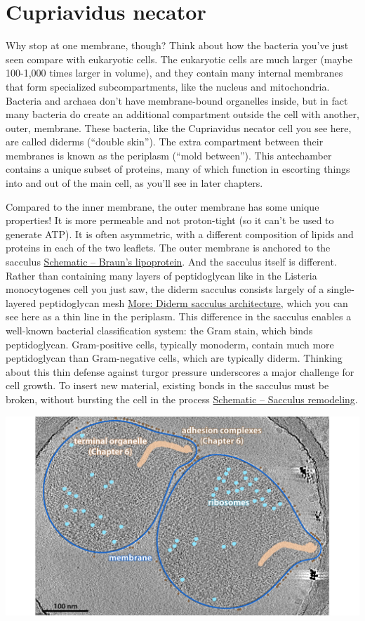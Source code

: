 \documentclass[]{tufte-book}
\begin{document}
\section{Cupriavidus necator}\label{cupriavidus-necator}

Why stop at one membrane, though? Think about how the bacteria you've
just seen compare with eukaryotic cells. The eukaryotic cells are much
larger (maybe 100-1,000 times larger in volume), and they contain many
internal membranes that form specialized subcompartments, like the
nucleus and mitochondria. Bacteria and archaea don't have membrane-bound
organelles inside, but in fact many bacteria do create an additional
compartment outside the cell with another, outer, membrane. These
bacteria, like the Cupriavidus necator cell you see here, are called
diderms (``double skin''). The extra compartment between their membranes
is known as the periplasm (``mold between''). This antechamber contains
a unique subset of proteins, many of which function in escorting things
into and out of the main cell, as you'll see in later chapters.

Compared to the inner membrane, the outer membrane has some unique
properties! It is more permeable and not proton-tight (so it can't be
used to generate ATP). It is often asymmetric, with a different
composition of lipids and proteins in each of the two leaflets. The
outer membrane is anchored to the sacculus
\protect\hyperlink{fig:2-3-1}{Schematic -- Braun's lipoprotein}. And the
sacculus itself is different. Rather than containing many layers of
peptidoglycan like in the Listeria monocytogenes cell you just saw, the
diderm sacculus consists largely of a single-layered peptidoglycan mesh
\protect\hyperlink{Diderm_sacculus_architecture}{More: Diderm sacculus
architecture}, which you can see here as a thin line in the periplasm.
This difference in the sacculus enables a well-known bacterial
classification system: the Gram stain, which binds peptidoglycan.
Gram-positive cells, typically monoderm, contain much more peptidoglycan
than Gram-negative cells, which are typically diderm. Thinking about
this thin defense against turgor pressure underscores a major challenge
for cell growth. To insert new material, existing bonds in the sacculus
must be broken, without bursting the cell in the process
\protect\hyperlink{fig:2-3-2}{Schematic -- Sacculus remodeling}.

\includegraphics{img/02_static/2_1_Mgenitalium}
\end{document}
